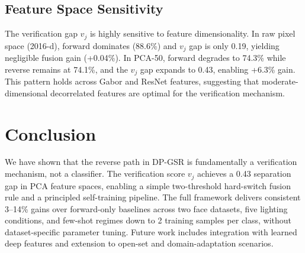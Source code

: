 \documentclass[10pt,comsoc]{IEEEtran}
\begin{document}
\subsection{Feature Space Sensitivity}

The verification gap $v_j$ is highly sensitive to feature dimensionality. In raw pixel space (2016-d), forward dominates (88.6\%) and $v_j$ gap is only 0.19, yielding negligible fusion gain (+0.04\%). In PCA-50, forward degrades to 74.3\% while reverse remains at 74.1\%, and the $v_j$ gap expands to 0.43, enabling +6.3\% gain. This pattern holds across Gabor and ResNet features, suggesting that moderate-dimensional decorrelated features are optimal for the verification mechanism.

\section{Conclusion}

We have shown that the reverse path in DP-GSR is fundamentally a verification mechanism, not a classifier. The verification score $v_j$ achieves a 0.43 separation gap in PCA feature spaces, enabling a simple two-threshold hard-switch fusion rule and a principled self-training pipeline. The full framework delivers consistent 3--14\% gains over forward-only baselines across two face datasets, five lighting conditions, and few-shot regimes down to 2 training samples per class, without dataset-specific parameter tuning. Future work includes integration with learned deep features and extension to open-set and domain-adaptation scenarios.
\end{document}
